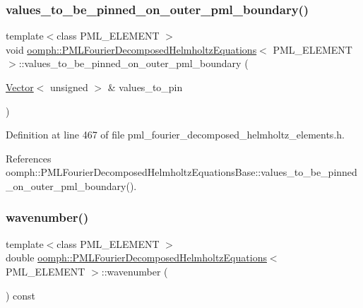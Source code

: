 \subsubsection{\texorpdfstring{values\+\_\+to\+\_\+be\+\_\+pinned\+\_\+on\+\_\+outer\+\_\+pml\+\_\+boundary()}{values\_to\_be\_pinned\_on\_outer\_pml\_boundary()}}
{\footnotesize\ttfamily template$<$class P\+M\+L\+\_\+\+E\+L\+E\+M\+E\+NT $>$ \\
void \hyperlink{classoomph_1_1PMLFourierDecomposedHelmholtzEquations}{oomph\+::\+P\+M\+L\+Fourier\+Decomposed\+Helmholtz\+Equations}$<$ P\+M\+L\+\_\+\+E\+L\+E\+M\+E\+NT $>$\+::values\+\_\+to\+\_\+be\+\_\+pinned\+\_\+on\+\_\+outer\+\_\+pml\+\_\+boundary (\begin{DoxyParamCaption}\item[{\hyperlink{classoomph_1_1Vector}{Vector}$<$ unsigned $>$ \&}]{values\+\_\+to\+\_\+pin }\end{DoxyParamCaption})\hspace{0.3cm}{\ttfamily [inline]}}



Definition at line 467 of file pml\+\_\+fourier\+\_\+decomposed\+\_\+helmholtz\+\_\+elements.\+h.



References oomph\+::\+P\+M\+L\+Fourier\+Decomposed\+Helmholtz\+Equations\+Base\+::values\+\_\+to\+\_\+be\+\_\+pinned\+\_\+on\+\_\+outer\+\_\+pml\+\_\+boundary().

\mbox{\label{classoomph_1_1PMLFourierDecomposedHelmholtzEquations_aca9ab7f8c621cd3d59fb73d7e2828dc0}} 
\subsubsection{\texorpdfstring{wavenumber()}{wavenumber()}}
{\footnotesize\ttfamily template$<$class P\+M\+L\+\_\+\+E\+L\+E\+M\+E\+NT $>$ \\
double \hyperlink{classoomph_1_1PMLFourierDecomposedHelmholtzEquations}{oomph\+::\+P\+M\+L\+Fourier\+Decomposed\+Helmholtz\+Equations}$<$ P\+M\+L\+\_\+\+E\+L\+E\+M\+E\+NT $>$\+::wavenumber (\begin{DoxyParamCaption}{ }\end{DoxyParamCaption}) const\hspace{0.3cm}{\ttfamily [inline]}}



